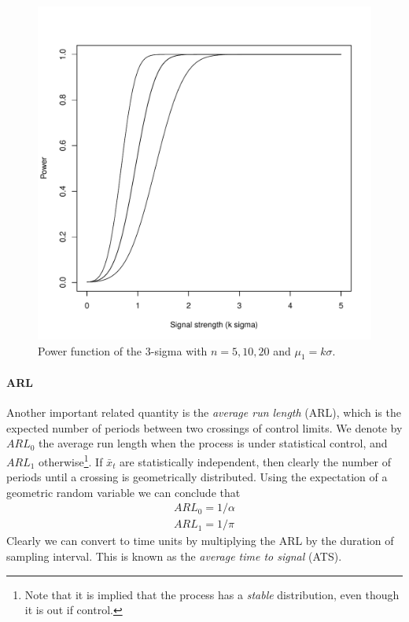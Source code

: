 \begin{figure}[h]
\centering
\includegraphics[height=0.3\textheight]{art/power_function.pdf}
\caption[Power Function]{Power function of the 3-sigma \barxChart with $n=5,10,20$ and $\mu_1=k \sigma$.}
\label{fig:power_function}
\end{figure}


\paragraph{ARL}
Another important related quantity is the \emph{average run length} (ARL), which is the expected number of periods between two crossings of control limits. 
We denote by $ARL_0$ the average run length when the process is under statistical control, and $ARL_1$ otherwise\footnote{Note that it is implied that the process has a \emph{stable} distribution, even though it is out if control.}. 
If $\bar{x}_t$ are statistically independent, then clearly the number of periods until a crossing is geometrically distributed. Using the expectation of a geometric random variable we can conclude that 
\begin{align}
	ARL_0=1/\alpha \label{eq:arl_0} \\
	ARL_1=1/\pi \label{eq:arl_1}
\end{align}
Clearly we can convert to time units by multiplying the ARL by the duration of sampling interval.
This is known as the \emph{average time to signal} (ATS).


